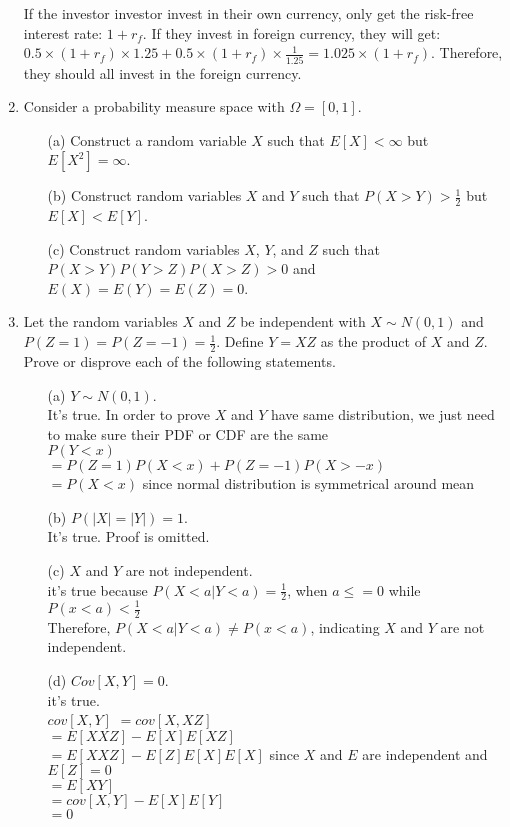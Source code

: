 \documentclass[letterpaper,12pt]{article}
\theoremstyle{definition}
\begin{document}
\begin{enumerate}
	If the investor investor invest in their own currency, only get the risk-free interest rate: $1 + r_f$. If they invest in foreign currency, they will get: $0.5 \times (1 + r_f) \times 1.25 + 0.5 \times (1 + r_f) \times \frac{1}{1.25} = 1.025 \times (1 + r_f)$. Therefore, they should all invest in the foreign currency.

\item Consider a probability measure space with $\Omega = [0,1]$.
		\begin{itemize}
			\item[(a)] Construct a random variable $X$ such that $E[X] < \infty$ but $E[X^2] = \infty$.
			\item[(b)] Construct random variables $X$ and $Y$ such that $P(X>Y)>\frac{1}{2}$ but $E[X]<E[Y]$.
			\item[(c)] Construct random variables $X$, $Y$, and $Z$ such that\\ $P(X>Y) P(Y>Z) P(X>Z) > 0$ and 						$E(X)=E(Y)=E(Z)=0$.
		\end{itemize}

	\item Let the random variables $X$ and $Z$ be independent with $X \sim N(0,1)$ and $P(Z=1)=P(Z=-1)=\frac{1}{2}$. 			Define $Y= XZ$ as the product of $X$ and $Z$. Prove or disprove each of the following statements.
		\begin{itemize}
			\item[(a)] $Y \sim N(0,1)$.\\
			It's true. In order to prove $X$ and $Y$ have same distribution, we just need to make sure their PDF or CDF are the same\\
			$P(Y < x)$\\
			$= P(Z = 1)P(X < x) + P(Z = -1)P(X > -x)$\\
			$= P(X<x)$ since normal distribution is symmetrical around mean\\

			\item[(b)] $P(|X|=|Y|)=1$.\\
			It's true. Proof is omitted.\\

			\item[(c)] $X$ and $Y$ are not independent.\\
			it's true because $P(X < a| Y < a)  = \frac{1}{2}$, when $a \leq = 0$ while $P(x < a) < \frac{1}{2}$\\
			Therefore, $P(X < a| Y < a) \neq P(x < a)$, indicating $X$ and $Y$ are not independent.\\
			\item[(d)] $Cov[X,Y]=0$.\\
			it's true.\\
			$cov[X, Y]$
			$= cov[X, XZ]$\\
			$= E[XXZ] - E[X]E[XZ]$\\
			$= E[XXZ] - E[Z]E[X]E[X]$ since $X$ and $E$ are independent and $E[Z] = 0$\\
			$= E[XY]$\\
			$= cov[X, Y] - E[X]E[Y]$\\
			$= 0$\\


\end{itemize}
\end{enumerate}
\end{document}
